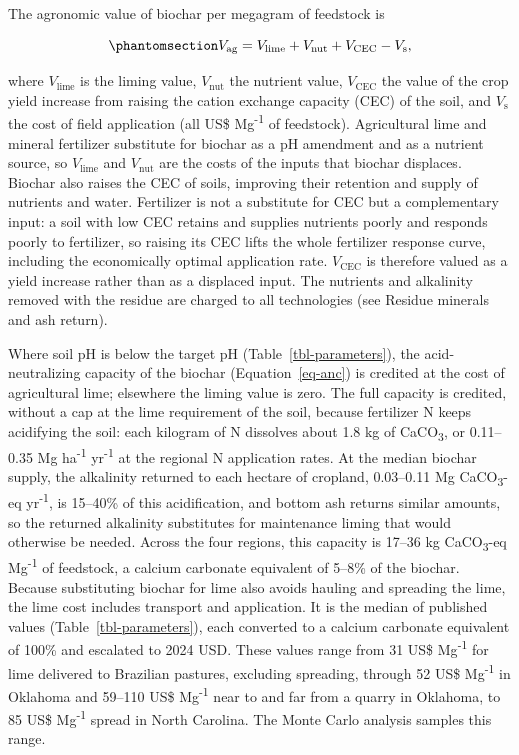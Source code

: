 \documentclass[
  letterpaper,
  twoside,
  twocolumn,
  9pt]{article}
\begin{document}
The agronomic value of biochar per megagram of feedstock is

\begin{equation}\phantomsection\label{eq-vag}{V_{\mathrm{ag}} = V_{\mathrm{lime}} + V_{\mathrm{nut}} + V_{\mathrm{CEC}} - V_{\mathrm{s}},}\end{equation}

where \(V_{\mathrm{lime}}\) is the liming value, \(V_{\mathrm{nut}}\)
the nutrient value, \(V_{\mathrm{CEC}}\) the value of the crop yield
increase from raising the cation exchange capacity (CEC) of the soil,
and \(V_{\mathrm{s}}\) the cost of field application (all US\$
Mg\textsuperscript{-1} of feedstock). Agricultural lime and mineral
fertilizer substitute for biochar as a pH amendment and as a nutrient
source, so \(V_{\mathrm{lime}}\) and \(V_{\mathrm{nut}}\) are the costs
of the inputs that biochar displaces. Biochar also raises the CEC of
soils, improving their retention and supply of nutrients and water.
Fertilizer is not a substitute for CEC but a complementary input: a soil
with low CEC retains and supplies nutrients poorly and responds poorly
to fertilizer, so raising its CEC lifts the whole fertilizer response
curve, including the economically optimal application rate.
\(V_{\mathrm{CEC}}\) is therefore valued as a yield increase rather than
as a displaced input. The nutrients and alkalinity removed with the
residue are charged to all technologies (see Residue minerals and ash
return).

Where soil pH is below the target pH (Table~\ref{tbl-parameters}), the
acid-neutralizing capacity of the biochar (Equation~\ref{eq-anc}) is
credited at the cost of agricultural lime; elsewhere the liming value is
zero. The full capacity is credited, without a cap at the lime
requirement of the soil, because fertilizer N keeps acidifying the soil:
each kilogram of N dissolves about 1.8 kg of
CaCO\textsubscript{3},\citep{zamanian2018} or 0.11--0.35 Mg
ha\textsuperscript{-1} yr\textsuperscript{-1} at the regional N
application rates. At the median biochar supply, the alkalinity returned
to each hectare of cropland, 0.03--0.11 Mg CaCO\textsubscript{3}-eq
yr\textsuperscript{-1}, is 15--40\% of this acidification, and bottom
ash returns similar amounts, so the returned alkalinity substitutes for
maintenance liming that would otherwise be needed. Across the four
regions, this capacity is 17--36 kg CaCO\textsubscript{3}-eq
Mg\textsuperscript{-1} of feedstock, a calcium carbonate equivalent of
5--8\% of the biochar. Because substituting biochar for lime also avoids
hauling and spreading the lime, the lime cost includes transport and
application. It is the median of published values
(Table~\ref{tbl-parameters}), each converted to a calcium carbonate
equivalent of 100\% and escalated to 2024 USD. These values range from
31 US\$ Mg\textsuperscript{-1} for lime delivered to Brazilian pastures,
excluding spreading,\citep{latawiec2019} through 52 US\$
Mg\textsuperscript{-1} in Oklahoma \citep{mills2020lime} and 59--110
US\$ Mg\textsuperscript{-1} near to and far from a quarry in
Oklahoma,\citep{cho2020lime} to 85 US\$ Mg\textsuperscript{-1} spread in
North Carolina.\citep{woods2026} The Monte Carlo analysis samples this
range.
\end{document}
